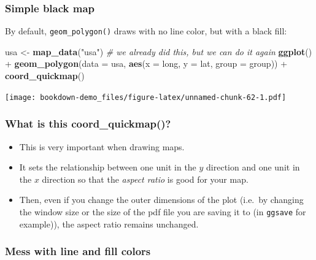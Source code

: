 \documentclass[]{book}
\newenvironment{Shaded}{\begin{snugshade}}{\end{snugshade}}
\newcommand{\KeywordTok}[1]{\textcolor[rgb]{0.13,0.29,0.53}{\textbf{{#1}}}}
\newcommand{\DataTypeTok}[1]{\textcolor[rgb]{0.13,0.29,0.53}{{#1}}}
\newcommand{\StringTok}[1]{\textcolor[rgb]{0.31,0.60,0.02}{{#1}}}
\newcommand{\CommentTok}[1]{\textcolor[rgb]{0.56,0.35,0.01}{\textit{{#1}}}}
\newcommand{\NormalTok}[1]{{#1}}
\providecommand{\tightlist}{%
  \setlength{\itemsep}{0pt}\setlength{\parskip}{0pt}}
\theoremstyle{definition}
\theoremstyle{definition}
\theoremstyle{remark}
\begin{document}
\subsubsection{Simple black map}\label{simple-black-map}

By default, \texttt{geom\_polygon()} draws with no line color, but with
a black fill:

\begin{Shaded}
\begin{Highlighting}[]
\NormalTok{usa <-}\StringTok{ }\KeywordTok{map_data}\NormalTok{(}\StringTok{"usa"}\NormalTok{) }\CommentTok{# we already did this, but we can do it again}
\KeywordTok{ggplot}\NormalTok{() +}\StringTok{ }
\StringTok{  }\KeywordTok{geom_polygon}\NormalTok{(}\DataTypeTok{data =} \NormalTok{usa, }\KeywordTok{aes}\NormalTok{(}\DataTypeTok{x =} \NormalTok{long, }\DataTypeTok{y =} \NormalTok{lat, }\DataTypeTok{group =} \NormalTok{group)) +}\StringTok{ }
\StringTok{  }\KeywordTok{coord_quickmap}\NormalTok{()}
\end{Highlighting}
\end{Shaded}

\texttt{[image: bookdown-demo\_files/figure-latex/unnamed-chunk-62-1.pdf]}

\subsubsection{What is this
coord\_quickmap()?}\label{what-is-this-coord_quickmap}

\begin{itemize}
\tightlist
\item
  This is very important when drawing maps.
\item
  It sets the relationship between one unit in the \(y\) direction and
  one unit in the \(x\) direction so that the \emph{aspect ratio} is
  good for your map.
\item
  Then, even if you change the outer dimensions of the plot (i.e.~by
  changing the window size or the size of the pdf file you are saving it
  to (in \texttt{ggsave} for example)), the aspect ratio remains
  unchanged.
\end{itemize}

\subsubsection{Mess with line and fill
colors}\label{mess-with-line-and-fill-colors}
\end{document}
